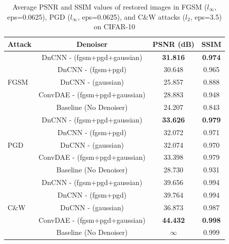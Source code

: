 \documentclass[10pt,journal,compsoc]{IEEEtran}
\begin{document}
\begin{table}[!h]
\renewcommand{\arraystretch}{1.3}
\caption{Average PSNR and SSIM values of restored images in FGSM ($l_{\infty}$, eps=0.0625), PGD ($l_{\infty}$, eps=0.0625), and C\&W attacks ($l_{2}$, eps=3.5) on CIFAR-10}
\label{table:psnr}
\centering
\begin{tabular}{|l | c||c|c |}
\hline
Attack & Denoiser & PSNR (dB) & SSIM \\
\hline\hline
\multirow{5}{*}{FGSM}
& DnCNN - (fgsm+pgd+gaussian) & \textbf{31.816} & \textbf{0.974}\\
\cline{2-4}
& DnCNN - (fgsm+pgd) &30.648 & 0.965\\
\cline{2-4}
& DnCNN - (gaussian) &25.857 & 0.888\\
\cline{2-4}
& ConvDAE - (fgsm+pgd+gaussian) &28.883 & 0.948\\
\cline{2-4}
& Baseline (No Denoiser) &24.207 & 0.843\\
\hline \hline
\multirow{5}{*}{PGD}
& DnCNN - (fgsm+pgd+gaussian) & \textbf{33.626} & \textbf{0.979}\\
\cline{2-4}
& DnCNN - (fgsm+pgd) &32.072 & 0.971\\
\cline{2-4}
& DnCNN - (gaussian) &32.074 & 0.970\\
\cline{2-4}
& ConvDAE - (fgsm+pgd+gaussian) &33.398 & 0.979\\
\cline{2-4}
& Baseline (No Denoiser) &28.730 & 0.931\\
\hline\hline
\multirow{5}{*}{C\&W}
& DnCNN - (fgsm+pgd+gaussian) & 39.656 & 0.994\\
\cline{2-4}
& DnCNN - (fgsm+pgd) &39.764 & 0.994\\
\cline{2-4}
& DnCNN - (gaussian) &36.873 & 0.987\\
\cline{2-4}
& ConvDAE - (fgsm+pgd+gaussian) &\textbf{44.432} & \textbf{0.998}\\
\cline{2-4}
& Baseline (No Denoiser) &$\infty$ & 0.999\\
\hline

\end{tabular}
\end{table}
\end{document}
